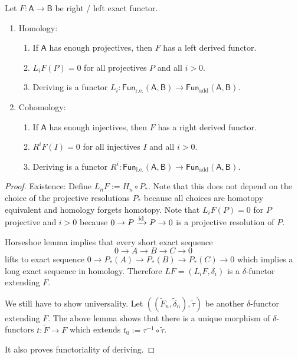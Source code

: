 \documentclass[fontsize=11pt,fleqn,a4paper]{scrartcl}
\begin{document}
\begin{theorem}
Let $F:\mathsf{A}\to\mathsf{B}$ be right / left exact functor.
\begin{multicols}{2}
\begin{enumerate}
\item Homology:
\begin{enumerate}
\item If $\mathsf{A}$ has enough projectives, then $F$ has a left derived functor.
\item $L_i F(P) = 0$ for all projectives $P$ and all $i>0$.
\item Deriving is a functor $L_i: \mathsf{Fun}_\text{r.e.}(\mathsf{A},\mathsf{B}) \to \mathsf{Fun}_\text{add}(\mathsf{A},\mathsf{B})$.
\end{enumerate}
\item Cohomology:
\begin{enumerate}
\item If $\mathsf{A}$ has enough injectives, then $F$ has a right derived functor.
\item $R^i F(I) = 0$ for all injectives $I$ and all $i>0$.
\item Deriving is a functor $R^i: \mathsf{Fun}_\text{l.e.}(\mathsf{A},\mathsf{B}) \to \mathsf{Fun}_\text{add}(\mathsf{A},\mathsf{B})$.
\end{enumerate}
\end{enumerate}
\end{multicols}
\end{theorem}
\begin{proof}
Existence: Define $L_nF := H_n \circ P_\ast$. Note that this does not depend on the choice of the projective resolutions $P_\ast$ because all choices are homotopy equivalent and homology forgets homotopy. Note that $L_i F(P) = 0$ for $P$ projective and $i>0$ because $0\to P\xrightarrow{\operatorname{id}} P \to 0$ is a projective resolution of $P$.

\medbreak
Horseshoe lemma implies that every short exact sequence
\[0\to A\to B\to C\to 0\]
lifts to exact sequence $0\to P_\ast(A) \to P_\ast(B) \to P_\ast(C)\to 0$ which implies a long exact sequence in homology. Therefore $LF=(L_i F,\delta_i)$ is a $\delta$-functor extending $F$.

\medbreak
We still have to show universality. Let $((\tilde{F}_n,\tilde{\delta}_n), \tilde{\tau})$ be another $\delta$-functor extending $F$. The above lemma shows that there is a unique morphism of $\delta$-functors $t: \tilde{F}\to F$ which extends $t_0 := \tau^{-1}\circ\tilde{\tau}$.

It also proves functoriality of deriving.
\end{proof}
\end{document}
